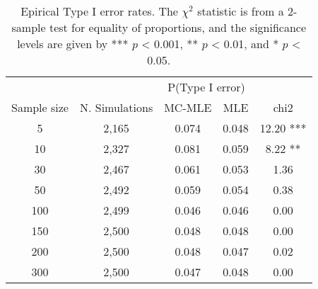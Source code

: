 \begin{table}[ht]
\centering
\begin{tabular}{ccccc}
\toprule & & \multicolumn{2}{c}{P(Type I error)} \\ \cmidrule(r){3-4}
Sample size & N. Simulations & MC-MLE & MLE & chi2 \\ 
  \midrule
5 & 2,165 & 0.074 & 0.048 & 12.20 *** \\ 
  10 & 2,327 & 0.081 & 0.059 & 8.22 ** \\ 
  30 & 2,467 & 0.061 & 0.053 & 1.36  \\ 
  50 & 2,492 & 0.059 & 0.054 & 0.38  \\ 
  100 & 2,499 & 0.046 & 0.046 & 0.00  \\ 
  150 & 2,500 & 0.048 & 0.048 & 0.00  \\ 
  200 & 2,500 & 0.048 & 0.047 & 0.02  \\ 
  300 & 2,500 & 0.047 & 0.048 & 0.00  \\ 
   \bottomrule
\end{tabular}
\caption{Epirical Type I error rates. The $\chi^2$ statistic is from a 2-sample test for equality of proportions, and the significance levels are given by *** $p$ < 0.001, ** $p$ < 0.01, and * $p$ < 0.05.} 
\end{table}
